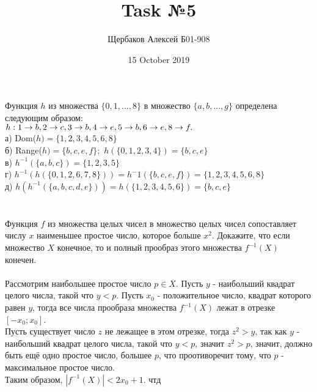 \documentclass{article}
\title{Task №5}
\author{Щербаков Алексей Б01-908}
\date{15 October 2019}
\begin{document}
\maketitle
\section{}
Функция $h$ из множества $\{0,1,...,8\}$ в множество $\{a,b,...,g\}$ определена следующим образом:
\\$h:1\rightarrow b, 2\rightarrow c, 3\rightarrow b, 4\rightarrow e, 5\rightarrow b, 6\rightarrow e, 8\rightarrow f.\\$\\
а) Dom($h) = \{1, 2, 3, 4, 5, 6, 8\}$\\
б) Range($h) = \{b, c, e, f\};$ $h(\{0,1,2,3,4\}) = \{b, c, e\}$\\
в) $h^{-1}(\{a, b, c\}) = \{1, 2, 3, 5\}$\\
г) $h^{-1}(h(\{0, 1, 2, 6, 7, 8\})) = h^-1(\{b, c, e, f\}) = \{1, 2, 3, 4, 5, 6, 8\}$\\
д) $h(h^{-1}(\{a, b, c, d, e\})) = h(\{1,2,3,4,5,6\}) = \{b,c,e\}$
\section{}
Функция $f$ из множества целых чисел в множество целых чисел сопоставляет числу $x$ наименьшее простое число, которое больше $x^2$. Докажите, что если множество $X$ конечное, то и полный прообраз этого множества $f^{-1}(X)$ конечен.\\\\
Рассмотрим наибольшее простое число $p\in X$. Пусть $y$ - наибольший квадрат целого числа, такой что $y<p$. Пусть $x_0$ - положительное число, квадрат которого равен $y$, тогда все числа прообраза множества $f^{-1}(X)$ лежат в отрезке $[-x_0;x_0]$.\\
Пусть существует число $z$ не лежащее в этом отрезке, тогда $z^2>y$, так как $y$ - наибольший квадрат целого числа, такой что $y<p$, значит $z^2 > p$, значит, должно быть ещё одно простое число, большее $p$, что проотиворечит тому, что $p$ - максимальное простое число.\\
Таким образом, $|f^{-1}(X)| < 2x_0 + 1$. чтд
\end{document}
